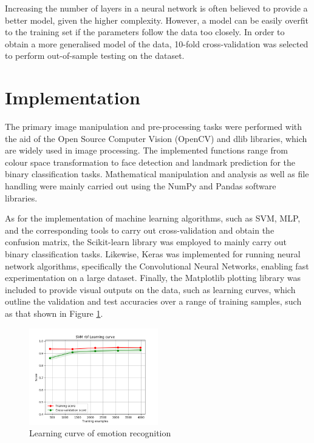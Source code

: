 \documentclass[conference]{IEEEtran}
\begin{document}
Increasing the number of layers in a neural network is often believed to provide a better model, given the higher complexity. However, a model can be easily overfit to the training set if the parameters follow the data too closely.
In order to obtain a more generalised model of the data, 10-fold cross-validation was selected to perform out-of-sample testing on the dataset.

\section{Implementation} \label{s-implement}


The primary image manipulation and pre-processing tasks were performed with the aid of the Open Source Computer Vision (OpenCV) and dlib libraries, which are widely used in image processing. The implemented functions range from colour space transformation to face detection and landmark prediction for the binary classification tasks. 
Mathematical manipulation and analysis as well as file handling were mainly carried out using the NumPy and Pandas software libraries.

As for the implementation of machine learning algorithms, such as SVM, MLP, and the corresponding tools to carry out cross-validation and obtain the confusion matrix, the Scikit-learn library was employed to mainly carry out binary classification tasks. 
Likewise, Keras was implemented for running neural network algorithms, specifically the Convolutional Neural Networks, enabling fast experimentation on a large dataset.
Finally, the Matplotlib plotting library was included to provide visual outputs on the data, such as learning curves, which outline the validation and test accuracies over a range of training samples, such as that shown in Figure \ref{fig: T1-LC}.

\begin{figure} [h] %
  \centering
    \includegraphics[width=0.5\textwidth]{graphs/T1_SVM_RBF} 
    \caption{Learning curve of emotion recognition}
    \label{fig: T1-LC}
\end{figure}
\end{document}
